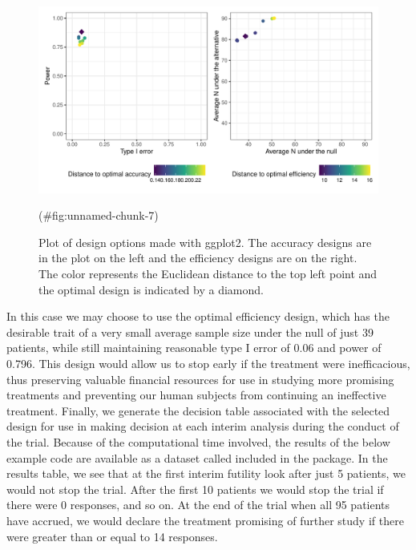 \begin{Schunk}
\begin{figure}
\includegraphics[width=1.1\linewidth]{zabor-hobbs-kane_files/figure-latex/unnamed-chunk-7-1} \caption[Plot of design options made with ggplot2]{Plot of design options made with ggplot2. The accuracy designs are in the plot on the left and the efficiency designs are on the right. The color represents the Euclidean distance to the top left point and the optimal design is indicated by a diamond.}(\#fig:unnamed-chunk-7)
\end{figure}
\end{Schunk}

In this case we may choose to use the optimal efficiency design, which
has the desirable trait of a very small average sample size under the
null of just 39 patients, while still maintaining reasonable type I
error of 0.06 and power of 0.796. This design would allow us to stop
early if the treatment were inefficacious, thus preserving valuable
financial resources for use in studying more promising treatments and
preventing our human subjects from continuing an ineffective treatment.
Finally, we generate the decision table associated with the selected
design for use in making decision at each interim analysis during the
conduct of the trial. Because of the computational time involved, the
results of the below example code are available as a dataset called
 included in the 
package. In the results table, we see that at the first interim futility
look after just 5 patients, we would not stop the trial. After the first
10 patients we would stop the trial if there were 0 responses, and so
on. At the end of the trial when all 95 patients have accrued, we would
declare the treatment promising of further study if there were greater
than or equal to 14 responses.

